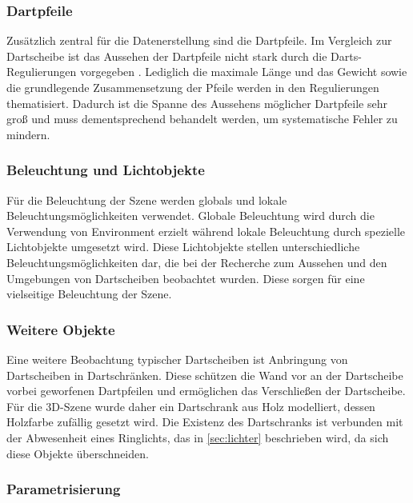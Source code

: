 \subsubsection{Dartpfeile}
\label{sec:dartpfeile}

Zusätzlich zentral für die Datenerstellung sind die Dartpfeile. Im Vergleich zur Dartscheibe ist das Aussehen der Dartpfeile nicht stark durch die Darts-Regulierungen vorgegeben \cite{wdf-rules,pdc_rules}. Lediglich die maximale Länge und das Gewicht sowie die grundlegende Zusammensetzung der Pfeile werden in den Regulierungen thematisiert. Dadurch ist die Spanne des Aussehens möglicher Dartpfeile sehr groß und muss dementsprechend behandelt werden, um systematische Fehler zu mindern.

\subsubsection{Beleuchtung und Lichtobjekte}
\label{sec:lichtobjekte}

Für die Beleuchtung der Szene werden globals und lokale Beleuchtungsmöglichkeiten verwendet. Globale Beleuchtung wird durch die Verwendung von Environment erzielt während lokale Beleuchtung durch spezielle Lichtobjekte umgesetzt wird. Diese Lichtobjekte stellen unterschiedliche Beleuchtungsmöglichkeiten dar, die bei der Recherche zum Aussehen und den Umgebungen von Dartscheiben beobachtet wurden. Diese sorgen für eine vielseitige Beleuchtung der Szene.

\subsubsection{Weitere Objekte}
\label{sec:weitere_objekte}

Eine weitere Beobachtung typischer Dartscheiben ist Anbringung von Dartscheiben in Dartschränken. Diese schützen die Wand vor an der Dartscheibe vorbei geworfenen Dartpfeilen und ermöglichen das Verschließen der Dartscheibe. Für die 3D-Szene wurde daher ein Dartschrank aus Holz modelliert, dessen Holzfarbe zufällig gesetzt wird. Die Existenz des Dartschranks ist verbunden mit der Abwesenheit eines Ringlichts, das in \autoref{sec:lichter} beschrieben wird, da sich diese Objekte überschneiden.

\subsubsection{Parametrisierung}
\label{sec:parameter}

